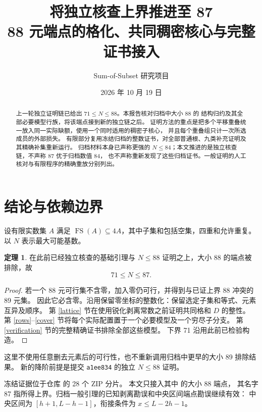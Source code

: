 \documentclass[11pt,a4paper]{article}
\title{将独立核查上界推进至 87\\\large 88 元端点的格化、共同稠密核心与完整证书接入}
\author{Sum-of-Subset 研究项目}
\date{2026 年 10 月 19 日}
\newcommand{\FS}{\operatorname{FS}}
\theoremstyle{definition}
\newtheorem{theorem}{定理}[section]
\begin{document}
\maketitle
\begin{abstract}
上一轮独立证明链已给出 $71\le N\le88$。本报告核对归档中大小 88 的
结构归约及其全部必要模型行族，将该端点接到新的独立链之后。
证明方法的重点是把多个平移重叠统一放入同一实际缺额，使用一个同时适用的稠密子核心，
并且每个重叠组只计一次所选成员的外部损失。
有限部分复用冻结归档的整数证书，对全部普通根、九类补充证明及其精确补集重新运行。
归档材料本身已声称更强的 $N\le84$；本文推进的是独立核查链，不声称 87 优于归档数值 84，
也不声称重新发现了这些归档证书。一般证明的人工核对与有限程序的精确重放分别列出。
\end{abstract}

\section{结论与依赖边界}
设有限实数集 $A$ 满足 $\FS(A)\subseteq4A$，其中子集和包括空集，四重和允许重复。
以 $N$ 表示最大可能基数。
\begin{theorem}\label{main}
在此前已经独立核查的基础引理与 $N\le88$ 证明之上，大小 88 的端点被排除，故
\[\boxed{71\le N\le87.}\]
\end{theorem}
\begin{proof}
若一个 88 元可行集不含零，加入零仍可行，并得到与已证上界 88 冲突的 89 元集。
因此它必含零。沿用保留零坐标的整数化：保留选定子集和等式、元素互异及顺序。
第 \ref{lattice} 节在使用锐化剥离常数之前证明共同格和 $D$ 的整性。
第 \ref{rows}--\ref{cover} 节将每个实际配置置于一个必要模型及一个穷尽子分支。
第 \ref{verification} 节的完整精确证书排除全部这些模型。
下界 71 沿用此前已检验构造。
\end{proof}
这里不使用任意删去元素后的可行性，也不重新调用归档中更早的大小 89 排除结果。
新的降阶前提是提交 \texttt{a1ee834} 的独立 $N\le88$ 证明。

冻结证据位于仓库  的 28 个 ZIP 分片。
本文只接入其中  的大小 88 端点，
其名字 87 指所得上界。归档一般引理的已知剥离勘误和中央区间端点勘误继续有效：
中央区间为 $[h+1,L-h-1]$，衔接条件为 $x\le L-2h-1$。
\end{document}
